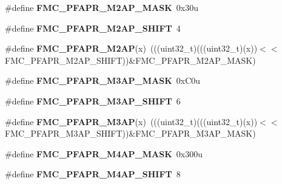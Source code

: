 \begin{DoxyCompactItemize}
\item 
\#define {\bfseries F\+M\+C\+\_\+\+P\+F\+A\+P\+R\+\_\+\+M2\+A\+P\+\_\+\+M\+A\+SK}~0x30u\hypertarget{group__FMC__Register__Masks_gab3e23f648e34da06b351ac745476f30c}{}\label{group__FMC__Register__Masks_gab3e23f648e34da06b351ac745476f30c}

\item 
\#define {\bfseries F\+M\+C\+\_\+\+P\+F\+A\+P\+R\+\_\+\+M2\+A\+P\+\_\+\+S\+H\+I\+FT}~4\hypertarget{group__FMC__Register__Masks_ga05f65455021f093de56e9e086f7185ee}{}\label{group__FMC__Register__Masks_ga05f65455021f093de56e9e086f7185ee}

\item 
\#define {\bfseries F\+M\+C\+\_\+\+P\+F\+A\+P\+R\+\_\+\+M2\+AP}(x)~(((uint32\+\_\+t)(((uint32\+\_\+t)(x))$<$$<$F\+M\+C\+\_\+\+P\+F\+A\+P\+R\+\_\+\+M2\+A\+P\+\_\+\+S\+H\+I\+FT))\&F\+M\+C\+\_\+\+P\+F\+A\+P\+R\+\_\+\+M2\+A\+P\+\_\+\+M\+A\+SK)\hypertarget{group__FMC__Register__Masks_ga625b34ad30829e1f89f056738b94bcff}{}\label{group__FMC__Register__Masks_ga625b34ad30829e1f89f056738b94bcff}

\item 
\#define {\bfseries F\+M\+C\+\_\+\+P\+F\+A\+P\+R\+\_\+\+M3\+A\+P\+\_\+\+M\+A\+SK}~0x\+C0u\hypertarget{group__FMC__Register__Masks_gae2347dc5794bb1de5793cd2a1c31854f}{}\label{group__FMC__Register__Masks_gae2347dc5794bb1de5793cd2a1c31854f}

\item 
\#define {\bfseries F\+M\+C\+\_\+\+P\+F\+A\+P\+R\+\_\+\+M3\+A\+P\+\_\+\+S\+H\+I\+FT}~6\hypertarget{group__FMC__Register__Masks_gacb37659011a95dffc2216ccedfafb212}{}\label{group__FMC__Register__Masks_gacb37659011a95dffc2216ccedfafb212}

\item 
\#define {\bfseries F\+M\+C\+\_\+\+P\+F\+A\+P\+R\+\_\+\+M3\+AP}(x)~(((uint32\+\_\+t)(((uint32\+\_\+t)(x))$<$$<$F\+M\+C\+\_\+\+P\+F\+A\+P\+R\+\_\+\+M3\+A\+P\+\_\+\+S\+H\+I\+FT))\&F\+M\+C\+\_\+\+P\+F\+A\+P\+R\+\_\+\+M3\+A\+P\+\_\+\+M\+A\+SK)\hypertarget{group__FMC__Register__Masks_ga958e56a4db58fd1840e7460f611af1fa}{}\label{group__FMC__Register__Masks_ga958e56a4db58fd1840e7460f611af1fa}

\item 
\#define {\bfseries F\+M\+C\+\_\+\+P\+F\+A\+P\+R\+\_\+\+M4\+A\+P\+\_\+\+M\+A\+SK}~0x300u\hypertarget{group__FMC__Register__Masks_ga7a4045976082b3e527eddd6a51204aaa}{}\label{group__FMC__Register__Masks_ga7a4045976082b3e527eddd6a51204aaa}

\item 
\#define {\bfseries F\+M\+C\+\_\+\+P\+F\+A\+P\+R\+\_\+\+M4\+A\+P\+\_\+\+S\+H\+I\+FT}~8\hypertarget{group__FMC__Register__Masks_gab5d59455fa080c08cf37d632a2b698cc}{}\label{group__FMC__Register__Masks_gab5d59455fa080c08cf37d632a2b698cc}


\end{DoxyCompactItemize}
